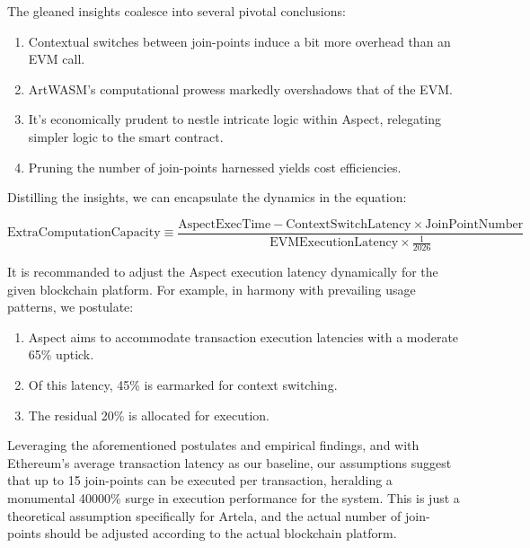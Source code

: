 The gleaned insights coalesce into several pivotal conclusions:

\begin{enumerate}
  \item Contextual switches between join-points induce a bit more overhead than an EVM call.
  \item ArtWASM's computational prowess markedly overshadows that of the EVM.
  \item It's economically prudent to nestle intricate logic within Aspect, relegating simpler logic to the smart contract.
  \item Pruning the number of join-points harnessed yields cost efficiencies.
\end{enumerate}

Distilling the insights, we can encapsulate the dynamics in the equation:

\[
  \text{ExtraComputationCapacity} \equiv \frac{\text{AspectExecTime} - \text{ContextSwitchLatency} \times \text{JoinPointNumber}}{\text{EVMExecutionLatency} \times \frac{1}{2026}}
\]

It is recommanded to adjust the Aspect execution latency dynamically for the given blockchain platform. For example, in harmony with prevailing usage patterns, we postulate:

\begin{enumerate}
  \item Aspect aims to accommodate transaction execution latencies with a moderate 65\% uptick.
  \item Of this latency, 45\% is earmarked for context switching.
  \item The residual 20\% is allocated for execution.
\end{enumerate}

Leveraging the aforementioned postulates and empirical findings, and with Ethereum's average transaction latency as our baseline, our assumptions suggest that up to 15 join-points can be executed per transaction, heralding a monumental 40000\% surge in execution performance for the system. This is just a theoretical assumption specifically for Artela, and the actual number of join-points should be adjusted according to the actual blockchain platform.

